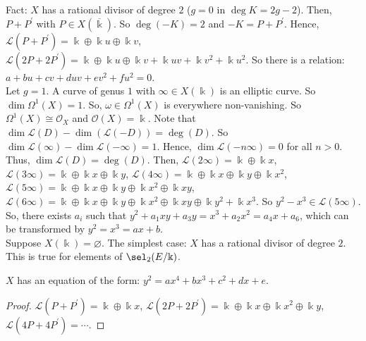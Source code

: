 \indent Fact:  $X$ has a rational divisor of degree $2$ ($g=0$ in $\deg K=2g-2$).  Then, $P+P^{\prime}$ with $P \in X(\overline{\Bbbk})$.  So $\deg(-K)=2$ and $-K=P+P^{\prime}$.  Hence, $\mathscr{L}(P+P^{\prime})=\Bbbk \oplus \Bbbk u \oplus \Bbbk v$, $\mathscr{L}(2P+2P^{\prime})=\Bbbk \oplus \Bbbk u \oplus \Bbbk v+\Bbbk uv+\Bbbk v^{2}+\Bbbk u^{2}$.  So there is a relation:  $a+bu+cv+duv+ev^{2}+fu^{2}=0$.\\
\indent Let $g=1$.  A curve of genus $1$ with $\infty \in X(\Bbbk)$ is an elliptic curve.  So $\dim \Omega^{1}(X)=1$.  So,  $\omega \in \Omega^{1}(X)$ is everywhere non-vanishing.  So $\Omega^{1}(X) \cong \mathscr{O}_{X}$ and $\mathscr{O}(X)=\Bbbk$.  Note that $\dim \mathscr{L}(D)-\dim(\mathscr{L}(-D))=\deg(D)$.  So $\dim \mathscr{L}(\infty)-\dim \mathscr{L}(-\infty)=1$.  Hence, $\dim \mathscr{L}(-n\infty)=0$ for all $n > 0$.  Thus, $\dim\mathscr{L}(D)=\deg(D)$.  Then, $\mathscr{L}(2\infty)=\Bbbk \oplus \Bbbk x$, $\mathscr{L}(3\infty)=\Bbbk \oplus \Bbbk x \oplus \Bbbk y$, $\mathscr{L}(4\infty)=\Bbbk \oplus \Bbbk x \oplus \Bbbk y \oplus \Bbbk x^{2}$, $\mathscr{L}(5\infty)=\Bbbk \oplus \Bbbk x \oplus \Bbbk y \oplus \Bbbk x^{2} \oplus \Bbbk xy$, $\mathscr{L}(6\infty)=\Bbbk \oplus \Bbbk x \oplus \Bbbk y \oplus \Bbbk x^{2} \oplus \Bbbk xy \oplus \Bbbk y^{2}+\Bbbk x^{3}$.  So $y^{2}-x^{3} \in \mathscr{L}(5\infty)$.  So, there exists $a_{i}$ such that $y^{2}+a_{1}xy+a_{3}y=x^{3}+a_{2}x^{2}=a_{4}x+a_{6}$, which can be transformed by $y^{2}=x^{3}=ax+b$.\\
\indent Suppose $X(\Bbbk)=\varnothing$.  The simplest case:  $X$ has a rational divisor of degree $2$.  This is true for elements of $\sel_{2}(E/\Bbbk)$.
\begin{theorem}
$X$ has an equation of the form:  $y^{2}=ax^{4}+bx^{3}+c^{2}+dx+e$.
\end{theorem}
\begin{proof}
$\mathscr{L}(P+P^{\prime})=\Bbbk \oplus \Bbbk x$, $\mathscr{L}(2P+2P^{\prime})=\Bbbk \oplus \Bbbk x \oplus \Bbbk x^{2} \oplus \Bbbk y$, $\mathscr{L}(4P+4P^{\prime})=\dotsb$.
\end{proof}